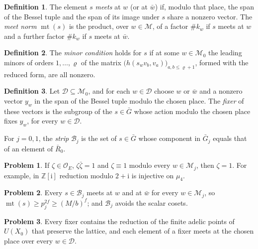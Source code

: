 \documentclass[reqno]{amsart}
\theoremstyle{definition}
\newtheorem{problem}{Problem}[section]
\newtheorem{definition}{Definition}[section]
\theoremstyle{plain}
\theoremstyle{remark}
\newcommand{\Z}{{\mathbb{Z}}}
\newcommand{\Oc}{\mathcal O}
\newcommand{\Bc}{\mathcal B}
\newcommand{\cMc}{\mathcal M}
\newcommand{\Gb}{\bar G}
\newcommand{\Rb}{\bar R_0}
\newcommand{\mt}{\operatorname{mt}}
\begin{document}
\begin{definition}\label{def:meet}
The element \(s\) \emph{meets} at \(w\) (or at \(\bar w\)) if, modulo that place, the span of the Bessel tuple and the span of its image under \(s\) share a nonzero vector.  The \emph{meet norm} \(\mt(s)\) is the product, over \(w\in\cMc\), of a factor \(\#k_w\) if \(s\) meets at \(w\) and a further factor \(\#k_w\) if \(s\) meets at \(\bar w\).
\end{definition}

\begin{definition}\label{def:open}
The \emph{minor condition} holds for \(s\) if at some \(w\in\cMc_0\) the leading minors of orders \(1,\dots,\varrho\) of the matrix \(\bigl(h(s_wv_b,v_a)\bigr)_{a,b\le\varrho+1}\), formed with the reduced form, are all nonzero.
\end{definition}

\begin{definition}\label{def:fixer}
Let \(\mathcal D\subseteq\cMc_0\), and for each \(w\in\mathcal D\) choose \(w\) or \(\bar w\) and a nonzero vector \(y_w\) in the span of the Bessel tuple modulo the chosen place.  The \emph{fixer} of these vectors is the subgroup of the \(s\in\Gb\) whose action modulo the chosen place fixes \(y_w\), for every \(w\in\mathcal D\).
\end{definition}

For \(j=0,1\), the \emph{strip} \(\Bc_j\) is the set of \(s\in\Gb\) whose component in \(\Gb_j\) equals that of an element of \(\Rb\).

\begin{problem}\label{pr:scalar-one}
If \(\zeta\in\Oc_E\), \(\zeta\bar\zeta=1\) and \(\zeta\equiv1\) modulo every \(w\in\cMc_j\), then \(\zeta=1\).  For example, in \(\Z[\mathrm i]\) reduction modulo \(2+\mathrm i\) is injective on \(\mu_4\).
\end{problem}

\begin{problem}\label{pr:strip-meets}
Every \(s\in\Bc_j\) meets at \(w\) and at \(\bar w\) for every \(w\in\cMc_j\), so \(\mt(s)\ge p_j^{2f}\ge(M/b)^f\); and \(\Bc_j\) avoids the scalar cosets.
\end{problem}

\begin{problem}\label{pr:fixer-meets}
Every fixer contains the reduction of the finite adelic points of \(U(X_0)\) that preserve the lattice, and each element of a fixer meets at the chosen place over every \(w\in\mathcal D\).
\end{problem}
\end{document}
